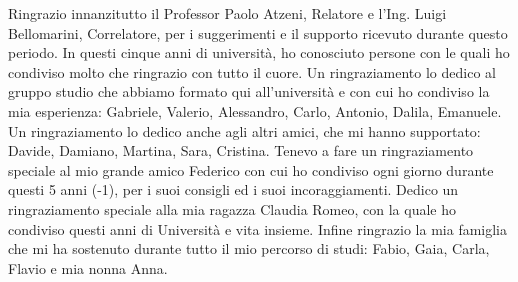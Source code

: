 Ringrazio innanzitutto il Professor Paolo Atzeni, Relatore e l'Ing. Luigi Bellomarini, Correlatore, per i suggerimenti e il supporto ricevuto durante questo periodo. \newline \newline
In questi cinque anni di università, ho conosciuto persone con le quali ho condiviso molto che ringrazio con tutto il cuore. \newline \newline
Un ringraziamento lo dedico al gruppo studio che abbiamo formato qui all'università e con cui ho condiviso la mia esperienza: Gabriele, Valerio, Alessandro, Carlo, Antonio, Dalila, Emanuele. \newline \newline
Un ringraziamento lo dedico anche agli altri amici, che mi hanno supportato: Davide, Damiano, Martina, Sara, Cristina. \newline \newline
Tenevo a fare un ringraziamento speciale al mio grande amico Federico con cui ho condiviso ogni giorno durante questi 5 anni (-1), per i suoi consigli ed i suoi incoraggiamenti. \newline \newline
Dedico un ringraziamento speciale alla mia ragazza Claudia Romeo, con la quale ho condiviso questi anni di Università e vita insieme.\newline \newline
Infine ringrazio la mia famiglia che mi ha sostenuto durante tutto il mio percorso di studi: Fabio, Gaia, Carla, Flavio e mia nonna Anna. \newline \newline